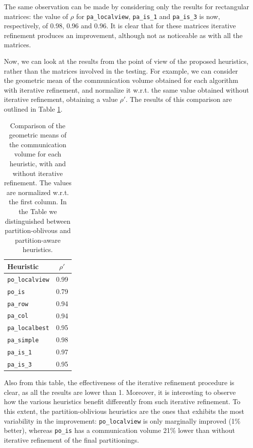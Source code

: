 The same observation can be made by considering only the results for rectangular matrices: the value of $\rho$ for \verb|pa_localview|, \verb|pa_is_1| and \verb|pa_is_3| is now, respectively, of 0.98, 0.96 and 0.96. It is clear that for these matrices iterative refinement produces an improvement, although not as noticeable as with all the matrices.

Now, we can look at the results from the point of view of the proposed heuristics, rather than the matrices involved in the testing. For example, we can consider the geometric mean of the communication volume obtained for each algorithm with iterative refinement, and normalize it w.r.t. the same value obtained without iterative refinement, obtaining a value $\rho'$. The results of this comparison are outlined in Table \ref{tab:comparison_ir}.

\begin{table}[H]
	\centering
	\begin{tabular}{|l|c|}\hline
		Heuristic & $\rho'$ \\ \hline
		\verb|po_localview|  & 0.99 \\
		\verb|po_is| & 0.79 \\ \hline
		\verb|pa_row| & 0.94 \\
		\verb|pa_col| & 0.94 \\
		\verb|pa_localbest| & 0.95 \\
		\verb|pa_simple| & 0.98 \\
		\verb|pa_is_1| & 0.97 \\
		\verb|pa_is_3| & 0.95 \\ \hline
	\end{tabular}
	\caption{Comparison of the geometric means of the communication volume for each heuristic, with and without iterative refinement. The values are normalized w.r.t. the first column. In the Table we distinguished between partition-oblivous and partition-aware heuristics.} \label{tab:comparison_ir}
\end{table}

Also from this table, the effectiveness of the iterative refinement procedure is clear, as all the results are lower than 1. Moreover, it is interesting to observe how the various heuristics benefit differently from such iterative refinement. To this extent, the partition-oblivious heuristics are the ones that exhibits the most variability in the improvement: \verb|po_localview| is only marginally improved (1\% better), whereas \verb|po_is| has a communication volume 21\% lower than without iterative refinement of the final partitionings.
